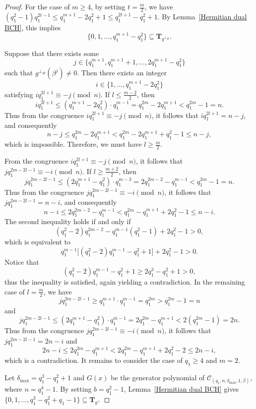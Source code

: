 \documentclass[10pt,a4paper]{amsart}
\begin{document}
\begin{proof}
For the case of $m\ge 4$, by setting $t = \frac{m}{2}$, we have
\(
(q_1^2 - 1)q_1^{2t-1} \le q_1^{m+1} - 2q_1^2 + 1 \le q_1^{2t+1} - q_1^2 + 1
\). By Lemma~\ref{Hermitian dual BCH}, this implies
\[
\{0,1,\dots,q_1^{m+1} - q_1^2\} \subseteq \mathbf{T}_{g^{\perp_H}}.
\]

Suppose that there exists some
\[
j \in \{q_1^{m+1}, q_1^{m+1} + 1, \dots, 2q_1^{m+1} - q_1^2\}
\]
such that $g^{\perp_H}(\beta^j) \ne 0$. Then there exists an integer
\[
i \in \{1, \dots, q_1^{m+1} - 2q_1^2\}
\]
satisfying
\(
i q_1^{2l+1} \equiv -j \pmod{n}
\). If $l \le \frac{m-2}{2}$, then
\[
i q_1^{2l+1} \le (q_1^{m+1} - 2q_1^2) \cdot q_1^{m-1}
= q_1^{2m} - 2q_1^{m+1}
< q_1^{2m} - 1 = n.
\]
Thus from the congruence $i q_1^{2l+1} \equiv -j \pmod{n}$, it follows that $i q_1^{2l+1} = n - j$, and consequently
\[
n - j \le q_1^{2m} - 2q_1^{m+1}
< q_1^{2m} - 2q_1^{m+1} + q_1^2 - 1
\le n - j,
\]
which is impossible. Therefore, we must have $l \ge \frac{m}{2}$.

From the congruence $i q_1^{2l+1} \equiv -j \pmod{n}$, it follows that
\(
j q_1^{2m-2l-1} \equiv -i \pmod{n}
\). If $l \ge \frac{m+2}{2}$, then
\[
j q_1^{2m-2l-1} \le (2q_1^{m+1} - q_1^2) \cdot q_1^{m-3}
= 2q_1^{2m-2} - q_1^{m-1}
< q_1^{2m} - 1 = n.
\]
Thus from the congruence $j q_1^{2m-2l-1} \equiv -i \pmod{n}$, it follows that $j q_1^{2m-2l-1} = n - i$, and consequently
\[
n - i \le 2q_1^{2m-2} - q_1^{m-1}
< q_1^{2m} - q_1^{m+1} + 2q_1^2 - 1
\le n - i.
\]
The second inequality holds if and only if
\[
(q_1^2 - 2)q_1^{2m-2} - q_1^{m-1}(q_1^2 - 1) + 2q_1^2 - 1 > 0,
\]
which is equivalent to
\[
q_1^{m-1}\big[(q_1^2 - 2)q_1^{m-1} - q_1^2 + 1\big] + 2q_1^2 - 1 > 0.
\]
Notice that
\[
(q_1^2 - 2)q_1^{m-1} - q_1^2 + 1 \ge 2q_1^3 - q_1^2 + 1 > 0,
\]
thus the inequality is satisfied, again yielding a contradiction. In the remaining case of $l=\frac{m}{2}$, we have
\[
j q_1^{2m-2l-1} \ge q_1^{m+1} \cdot q_1^{m-1} = q_1^{2m} > q_1^{2m} - 1 = n
\]
and
\[
j q_1^{2m-2l-1} \le (2q_1^{m+1} - q_1^2) \cdot q_1^{m-1}
= 2q_1^{2m} - q_1^{m+1}
< 2(q_1^{2m} - 1) = 2n.
\]
Thus from the congruence $j q_1^{2m-2l-1} \equiv -i \pmod{n}$, it follows that $j q_1^{2m-2l-1} = 2n - i$ and
\[
2n - i \le 2q_1^{2m} - q_1^{m+1}
< 2q_1^{2m} - q_1^{m+1} + 2q_1^2 - 2
\le 2n - i,
\]
which is a contradiction. It remains to consider the case of $q_1\ge 4$ and $m = 2$.

Let $\delta_{\max} = q_1^3 - q_1^2 + 1$ and $G(x)$ be the generator polynomial of $\mathcal{C}_{(q_1, n, \delta_{\max}, 1, \beta)}$, where $n = q_1^4 - 1$. By setting $b=q_1^2-1$, Lemma~\ref{Hermitian dual BCH} gives $\{0,1,\dots,q_1^3 - q_1^2 + q_1 - 1\} \subseteq \mathbf{T}_{g^{\perp}}$


\end{proof}
\end{document}
